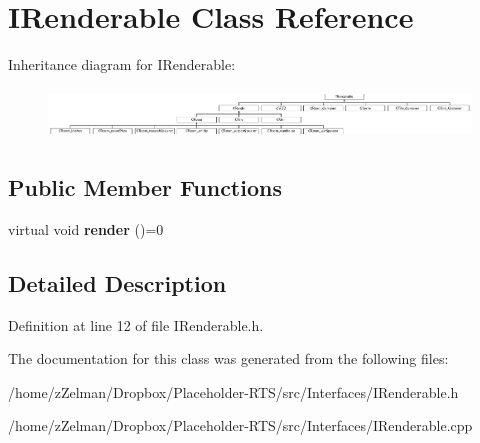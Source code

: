 \hypertarget{classIRenderable}{\section{I\-Renderable Class Reference}
\label{classIRenderable}
}
Inheritance diagram for I\-Renderable\-:\begin{figure}[H]
\begin{center}
\leavevmode
\includegraphics[height=1.333333cm]{classIRenderable}
\end{center}
\end{figure}
\subsection*{Public Member Functions}
\begin{DoxyCompactItemize}
\item 
\hypertarget{classIRenderable_a37e98b42ca496d2f6e6f69656754952e}{virtual void {\bfseries render} ()=0}\label{classIRenderable_a37e98b42ca496d2f6e6f69656754952e}

\end{DoxyCompactItemize}


\subsection{Detailed Description}


Definition at line 12 of file I\-Renderable.\-h.



The documentation for this class was generated from the following files\-:\begin{DoxyCompactItemize}
\item 
/home/z\-Zelman/\-Dropbox/\-Placeholder-\/\-R\-T\-S/src/\-Interfaces/I\-Renderable.\-h\item 
/home/z\-Zelman/\-Dropbox/\-Placeholder-\/\-R\-T\-S/src/\-Interfaces/I\-Renderable.\-cpp\end{DoxyCompactItemize}
